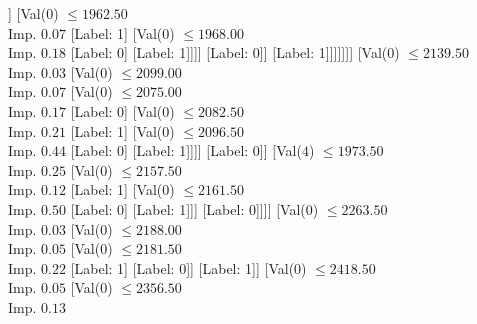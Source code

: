 \documentclass[margin=10pt]{standalone}
\begin{document}
\begin{forest}
												[Label: 0]
												[Val($0$) $ \leq 1779.50$ \\ Imp. $0.01$
													[Label: 1]
													[Val($0$) $ \leq 1798.00$ \\ Imp. $0.03$
														[Label: 0]
														[Val($0$) $ \leq 1809.50$ \\ Imp. $0.03$
															[Label: 1]
															[Val($0$) $ \leq 2035.50$ \\ Imp. $0.02$
																[Val($0$) $ \leq 2023.50$ \\ Imp. $0.04$
																	[Val($0$) $ \leq 1926.50$ \\ Imp. $0.02$
																		[Val($0$) $ \leq 1841.50$ \\ Imp. $0.02$
																			[Label: 1]
																			[Label: 0]]
																		[Val($0$) $ \leq 1962.50$ \\ Imp. $0.07$
																			[Label: 1]
																			[Val($0$) $ \leq 1968.00$ \\ Imp. $0.18$
																				[Label: 0]
																				[Label: 1]]]]
																	[Label: 0]]
																[Label: 1]]]]]]]
										[Val($0$) $ \leq 2139.50$ \\ Imp. $0.03$
											[Val($0$) $ \leq 2099.00$ \\ Imp. $0.07$
												[Val($0$) $ \leq 2075.00$ \\ Imp. $0.17$
													[Label: 0]
													[Val($0$) $ \leq 2082.50$ \\ Imp. $0.21$
														[Label: 1]
														[Val($0$) $ \leq 2096.50$ \\ Imp. $0.44$
															[Label: 0]
															[Label: 1]]]]
												[Label: 0]]
											[Val($4$) $ \leq 1973.50$ \\ Imp. $0.25$
												[Val($0$) $ \leq 2157.50$ \\ Imp. $0.12$
													[Label: 1]
													[Val($0$) $ \leq 2161.50$ \\ Imp. $0.50$
														[Label: 0]
														[Label: 1]]]
												[Label: 0]]]]
									[Val($0$) $ \leq 2263.50$ \\ Imp. $0.03$
										[Val($0$) $ \leq 2188.00$ \\ Imp. $0.05$
											[Val($0$) $ \leq 2181.50$ \\ Imp. $0.22$
												[Label: 1]
												[Label: 0]]
											[Label: 1]]
										[Val($0$) $ \leq 2418.50$ \\ Imp. $0.05$
											[Val($0$) $ \leq 2356.50$ \\ Imp. $0.13$

\end{forest}
\end{document}
